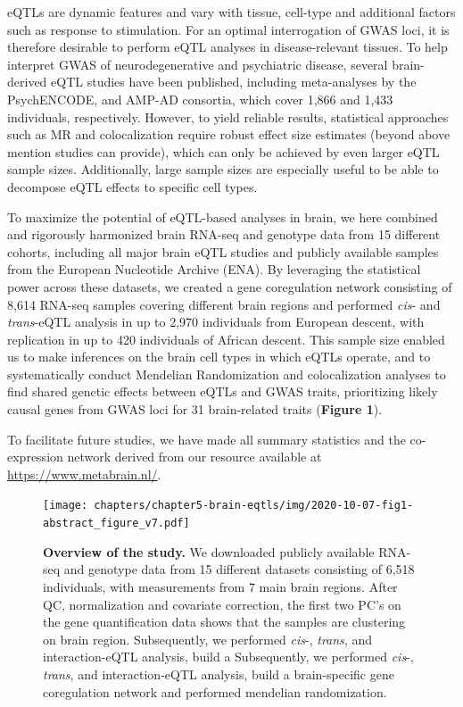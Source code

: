 eQTLs are dynamic features and vary with tissue, cell-type and additional factors such as response to stimulation. For an optimal interrogation of GWAS loci, it is therefore desirable to perform eQTL analyses in disease-relevant tissues\cite{donovanCellularDeconvolutionGTEx2020}. To help interpret GWAS of neurodegenerative and psychiatric disease, several brain-derived eQTL studies have been published, including meta-analyses by the PsychENCODE\cite{wangComprehensiveFunctionalGenomic2018}, and AMP-AD\cite{rajIntegrativeTranscriptomeAnalyses2018} consortia, which cover 1,866 and 1,433 individuals, respectively. However, to yield reliable results, statistical approaches such as MR and colocalization require robust effect size estimates (beyond above mention studies can provide), which can only be achieved by even larger eQTL sample sizes. Additionally, large sample sizes are especially useful to be able to decompose eQTL effects to specific cell types. 
 
To maximize the potential of eQTL-based analyses in brain, we here combined and rigorously harmonized brain RNA-seq and genotype data from 15 different cohorts, including all major brain eQTL studies and publicly available samples from the European Nucleotide Archive (ENA). By leveraging the statistical power across these datasets, we created a gene coregulation network consisting of 8,614 RNA-seq samples covering different brain regions and performed \emph{cis}- and \emph{trans}-eQTL analysis in up to 2,970 individuals from European descent, with replication in up to 420 individuals of African descent. This sample size enabled us to make inferences on the brain cell types in which eQTLs operate, and to systematically conduct Mendelian Randomization and colocalization analyses to find shared genetic effects between eQTLs and GWAS traits, prioritizing likely causal genes from GWAS loci for 31 brain-related traits (\textbf{Figure 1}).   

To facilitate future studies, we have made all summary statistics and the co-expression network derived from our resource available at \url{https://www.metabrain.nl/}. 

\begin{figure}[h!]
	\texttt{[image: chapters/chapter5-brain-eqtls/img/2020-10-07-fig1-abstract\_figure\_v7.pdf]}
	\caption{\textbf{Overview of the study.} We downloaded publicly available RNA-seq and genotype data from 15 different datasets consisting of 6,518 individuals, with measurements from 7 main brain regions.  After QC, normalization and covariate correction, the first two PC’s on the gene quantification data shows that the samples are clustering on brain region. Subsequently, we performed \emph{cis}-, \emph{trans}, and interaction-eQTL analysis, build a Subsequently, we performed \emph{cis}-, \emph{trans}, and interaction-eQTL analysis, build a brain-specific gene coregulation network and performed mendelian randomization.}
\end{figure}


